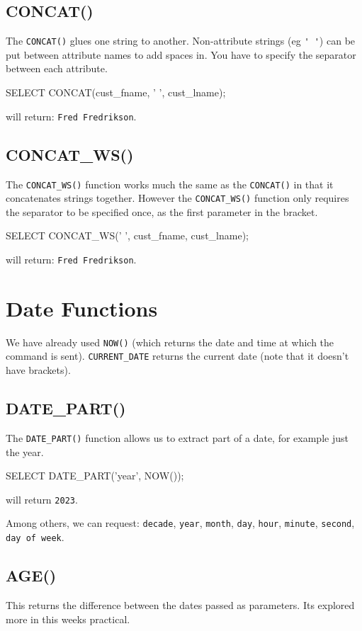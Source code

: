 \subsection*{CONCAT()}
The \verb|CONCAT()| glues one string to another. Non-attribute strings (eg \verb|' '|) can be put between attribute names to add spaces in. You have to specify the separator between each attribute.
\begin{sql}
SELECT CONCAT(cust_fname, ' ', cust_lname);
\end{sql}
will return: \verb|Fred Fredrikson|.

\subsection*{CONCAT\_WS()}
The \verb|CONCAT_WS()| function works much the same as the \verb|CONCAT()| in that it concatenates strings together. However the \verb|CONCAT_WS()| function only requires the separator to be specified once, as the first parameter in the bracket.
\begin{sql}
SELECT CONCAT_WS(' ', cust_fname, cust_lname);
\end{sql}
will return: \verb|Fred Fredrikson|.

\section*{Date Functions}
We have already used \verb|NOW()| (which returns the date and time at which the command is sent). \verb|CURRENT_DATE| returns the current date (note that it doesn't have brackets). 
\subsection*{DATE\_PART()}
The \verb|DATE_PART()| function allows us to extract part of a date, for example just the year.
\begin{sql}
SELECT DATE_PART('year', NOW());
\end{sql}
will return \verb|2023|.

Among others, we can request: \verb|decade|, \verb|year|, \verb|month|, \verb|day|, \verb|hour|, \verb|minute|, \verb|second|, \verb|day of week|.

\subsection*{AGE()}
This returns the difference between the dates passed as parameters. Its explored more in this weeks practical.

